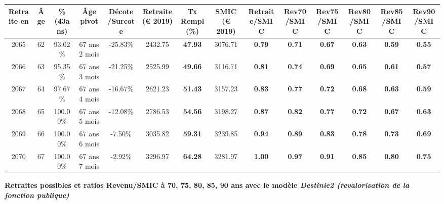 \begin{adjustbox}{max width=\textwidth} 
\begin{tabular}[htb]{|c|c||c|c|c||c|c||c||c|c|c|c|c|c|} 
\hline 
 Retraite en &  Âge &  \%(43ans) &  Âge pivot &  Décote/Surcote &  Retraite (\euro{} 2019) &  Tx Rempl(\%) &  SMIC (\euro{} 2019) &  Retraite/SMIC &  Rev70/SMIC &  Rev75/SMIC &  Rev80/SMIC &  Rev85/SMIC &  Rev90/SMIC \\ 
\hline \hline 
 2065 &  62 &  93.02\% &  67 ans 2 mois &  -25.83\% &  2432.75 &  {\bf 47.93} &  3076.71 &  {\bf {\color{red} 0.79}} &  {\bf {\color{red} 0.71}} &  {\bf {\color{red} 0.67}} &  {\bf {\color{red} 0.63}} &  {\bf {\color{red} 0.59}} &  {\bf {\color{red} 0.55}} \\ 
\hline 
 2066 &  63 &  95.35\% &  67 ans 3 mois &  -21.25\% &  2525.99 &  {\bf 49.66} &  3116.71 &  {\bf {\color{red} 0.81}} &  {\bf {\color{red} 0.74}} &  {\bf {\color{red} 0.69}} &  {\bf {\color{red} 0.65}} &  {\bf {\color{red} 0.61}} &  {\bf {\color{red} 0.57}} \\ 
\hline 
 2067 &  64 &  97.67\% &  67 ans 4 mois &  -16.67\% &  2621.23 &  {\bf 51.43} &  3157.23 &  {\bf {\color{red} 0.83}} &  {\bf {\color{red} 0.77}} &  {\bf {\color{red} 0.72}} &  {\bf {\color{red} 0.68}} &  {\bf {\color{red} 0.63}} &  {\bf {\color{red} 0.59}} \\ 
\hline 
 2068 &  65 &  100.00\% &  67 ans 5 mois &  -12.08\% &  2786.53 &  {\bf 54.56} &  3198.27 &  {\bf {\color{red} 0.87}} &  {\bf {\color{red} 0.82}} &  {\bf {\color{red} 0.77}} &  {\bf {\color{red} 0.72}} &  {\bf {\color{red} 0.67}} &  {\bf {\color{red} 0.63}} \\ 
\hline 
 2069 &  66 &  100.00\% &  67 ans 6 mois &  -7.50\% &  3035.82 &  {\bf 59.31} &  3239.85 &  {\bf {\color{red} 0.94}} &  {\bf {\color{red} 0.89}} &  {\bf {\color{red} 0.83}} &  {\bf {\color{red} 0.78}} &  {\bf {\color{red} 0.73}} &  {\bf {\color{red} 0.69}} \\ 
\hline 
 2070 &  67 &  100.00\% &  67 ans 7 mois &  -2.92\% &  3296.97 &  {\bf 64.28} &  3281.97 &  {\bf 1.00} &  {\bf {\color{red} 0.97}} &  {\bf {\color{red} 0.91}} &  {\bf {\color{red} 0.85}} &  {\bf {\color{red} 0.80}} &  {\bf {\color{red} 0.75}} \\ 
\hline 
\hline 
\end{tabular} 
\end{adjustbox} 
 
 \vspace{0.1cm} 
{\bf \noindent Retraites possibles et ratios Revenu/SMIC à 70, 75, 80, 85, 90 ans avec le modèle \emph{Destinie2 (revalorisation de la fonction publique)}}  
 
